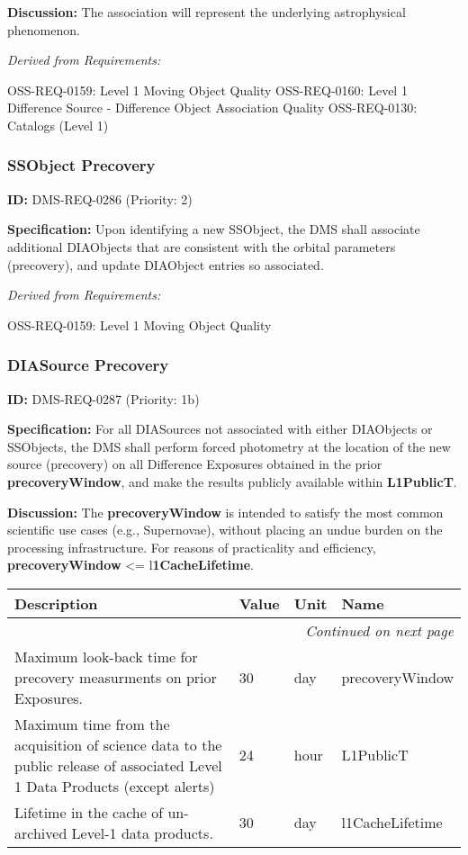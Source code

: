\documentclass[SE,toc,lsstdraft]{lsstdoc}
\makeatletter
\newcommand{\paramname}[1]{\hspace{0pt}#1}
\newcommand{\unitname}[1]{\hspace{0pt}#1}
\newenvironment{parameters}[0]{%
\setlength\LTleft{0pt}
\setlength\LTright{\fill}
\begin{small}
\begin{longtable}[]{|p{0.49\textwidth}|l|p{0.6in}|p{1.70in}@{}|}

\hline \textbf{Description} & \textbf{Value} & \textbf{Unit} & \textbf{Name} \\ \hline
\endhead

\hline \multicolumn{4}{r}{\emph{Continued on next page}} \\
\endfoot

\hline\hline
\endlastfoot
}{%
\hline
\end{longtable}
\end{small}
}
\makeatother
\begin{document}
\textbf{Discussion: }The association will represent the underlying astrophysical phenomenon.

\emph{Derived from Requirements:}

OSS-REQ-0159:
Level 1 Moving Object Quality \newline
OSS-REQ-0160:
Level 1 Difference Source - Difference Object Association Quality \newline
OSS-REQ-0130:
Catalogs (Level 1) \newline

\subsubsection{SSObject Precovery}

\label{DMS-REQ-0286}
\textbf{ID:} DMS-REQ-0286 (Priority: 2)

\textbf{Specification:} Upon identifying a new SSObject, the DMS shall associate additional DIAObjects that are consistent with the orbital parameters (precovery), and update DIAObject entries so associated.

\emph{Derived from Requirements:}

OSS-REQ-0159:
Level 1 Moving Object Quality \newline

\subsubsection{DIASource Precovery}

\label{DMS-REQ-0287}
\textbf{ID:} DMS-REQ-0287 (Priority: 1b)

\textbf{Specification:} For all DIASources not associated with either DIAObjects or SSObjects, the DMS shall perform forced photometry at the location of the new source (precovery) on all Difference Exposures obtained in the prior \textbf{precoveryWindow}, and make the results publicly available within \textbf{L1PublicT}.

\textbf{Discussion: }The \textbf{precoveryWindow }is intended to satisfy the most common scientific use cases (e.g., Supernovae), without placing an undue burden on the processing infrastructure.  For reasons of practicality and efficiency, \textbf{precoveryWindow }<= l\textbf{1CacheLifetime}.

\begin{parameters}
Maximum look-back time for precovery measurments on prior Exposures.
&
30
&
\unitname{%
day
}
&
\paramname{%
precoveryWindow
} \\\hline
Maximum time from the acquisition of science data to the public release of associated Level 1 Data Products (except alerts)
&
24
&
\unitname{%
hour
}
&
\paramname{%
L1PublicT
} \\\hline
Lifetime in the cache of un-archived Level-1 data products.
&
30
&
\unitname{%
day
}
&
\paramname{%
l1CacheLifetime
} \\\hline
\end{parameters}
\end{document}
